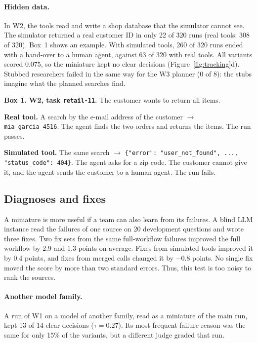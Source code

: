 \paragraph{Hidden data.}
In W2, the tools read and write a shop database that the simulator cannot see. The simulator
returned a real customer ID in only 22 of 320 runs (real tools: 308 of 320). Box~1 shows an
example. With simulated tools, 260 of 320 runs ended with a hand-over to a human agent, against 63
of 320 with real tools. All variants scored 0.075, so the miniature kept no clear decisions
(Figure~\ref{fig:tracking}d). Stubbed researchers failed in the same way for the W3 planner (0 of
8): the stubs imagine what the planned searches find.

\begin{note}
\textbf{Box 1. W2, task \texttt{retail-11}.} The customer wants to return all items.

\smallskip\textcolor{simgreen!70!black}{\textbf{Real tool.}} A search by the e-mail address of the customer
$\rightarrow$ \texttt{mia\_garcia\_4516}. The agent finds the two orders and returns the items.
The run passes.

\smallskip\textcolor{mergeorange}{\textbf{Simulated tool.}} The same search $\rightarrow$
\texttt{\{"error": "user\_not\_found", ..., "status\_code": 404\}}. The agent asks for a zip code.
The customer cannot give it, and the agent sends the customer to a human agent. The run fails.
\end{note}

\subsection{Diagnoses and fixes}
A miniature is more useful if a team can also learn from its failures. A blind LLM instance read the
failures of one source on 20 development questions and wrote three fixes. Two fix sets from the
same full-workflow failures improved the full workflow by 2.9 and 1.3 points on average. Fixes from
simulated tools improved it by 0.4 points, and fixes from merged calls changed it by $-0.8$ points.
No single fix moved the score by more than two standard errors. Thus, this test is too noisy to
rank the sources.

\paragraph{Another model family.}
A run of W1 on a model of another family, read as a miniature of the main run, kept 13 of 14 clear
decisions ($\tau = 0.27$). Its most frequent failure reason was the same for only 15\% of the
variants, but a different judge graded that run.
